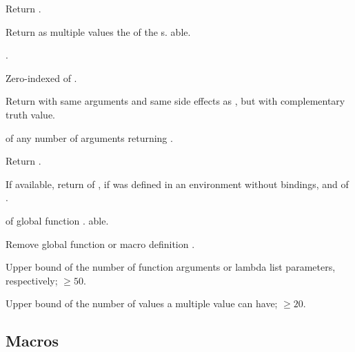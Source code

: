 \begin{LIST}{1cm}
  {
    Return .
  }

  {
  Return as multiple values the  of the
  s. able. 
  }

  {
    .
  }

  {
  Zero-indexed  of .
  }

  {
  Return  with same arguments and same side effects
  as , but with complementary truth value.
  }

  {
     of any number of arguments returning .
  }

  {
  Return .
  }

  {
  If available, return  of ,
  \retvalii{\NIL} if  was defined in an environment
  without bindings, and  of . 
  }

  {
   of global function . able.
  }

  {
  Remove global function or macro definition .
  }

  {
  Upper bound of the number of function arguments or lambda list
  parameters, respectively; $\geq50$. 
  }

  {
  Upper bound of the number of values a multiple value can have;
  $\geq20$. 
  }

\end{LIST}


\subsection{Macros}
\label{section:Macros}

